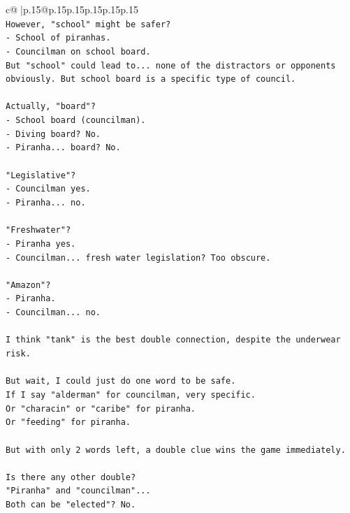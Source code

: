 \documentclass{article}
\begin{document}
{\begin{supertabular}{c@{$\;$}|p{.15\linewidth}@{}p{.15\linewidth}p{.15\linewidth}p{.15\linewidth}p{.15\linewidth}p{.15\linewidth}}
{{{\\ 
\texttt{However, "school" might be safer?} \\
\texttt{{-} School of piranhas.} \\
\texttt{{-} Councilman on school board.} \\
\texttt{But "school" could lead to... none of the distractors or opponents obviously. But school board is a specific type of council.} \\
\\ 
\texttt{Actually, "board"?} \\
\texttt{{-} School board (councilman).} \\
\texttt{{-} Diving board? No.} \\
\texttt{{-} Piranha... board? No.} \\
\\ 
\texttt{"Legislative"?} \\
\texttt{{-} Councilman yes.} \\
\texttt{{-} Piranha... no.} \\
\\ 
\texttt{"Freshwater"?} \\
\texttt{{-} Piranha yes.} \\
\texttt{{-} Councilman... fresh water legislation? Too obscure.} \\
\\ 
\texttt{"Amazon"?} \\
\texttt{{-} Piranha.} \\
\texttt{{-} Councilman... no.} \\
\\ 
\texttt{I think "tank" is the best double connection, despite the underwear risk.} \\
\\ 
\texttt{But wait, I could just do one word to be safe.} \\
\texttt{If I say "alderman" for councilman, very specific.} \\
\texttt{Or "characin" or "caribe" for piranha.} \\
\texttt{Or "feeding" for piranha.} \\
\\ 
\texttt{But with only 2 words left, a double clue wins the game immediately.} \\
\\ 
\texttt{Is there any other double?} \\
\texttt{"Piranha" and "councilman"...} \\
\texttt{Both can be "elected"? No.} \\
}}}
\end{supertabular}}
\end{document}
